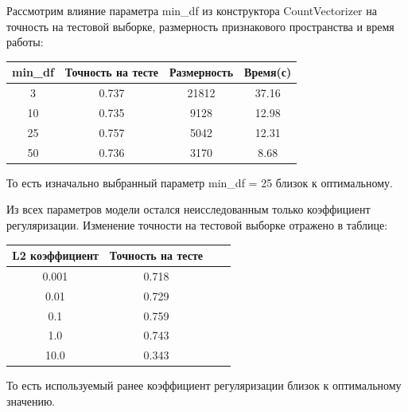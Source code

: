 \documentclass{article}
\begin{document}
                Рассмотрим влияние параметра min\_df из конструктора CountVectorizer на точность на тестовой выборке, размерность признакового пространства и время работы:
                \begin{center}
                    \begin{tabular}{| c | c | c | c |}
                        \hline
                        min\_df & Точность на тесте & Размерность & Время(с) \\
                        \hline
                        3 & 0.737 & 21812 & 37.16\\
                        \hline
                        10 & 0.735 & 9128 & 12.98 \\
                        \hline
                        25 & 0.757 & 5042 & 12.31 \\
                        \hline
                        50 & 0.736 & 3170 & 8.68 \\
                        \hline
                    \end{tabular}
                \end{center}

                То есть изначально выбранный параметр min\_df = 25 близок к оптимальному.

                Из всех параметров модели остался неисследованным только коэффициент регуляризации. Изменение точности на тестовой выборке отражено в таблице:
                \begin{center}
                    \begin{tabular}{| c | c | c | c |}
                        \hline
                        L2 коэффициент & Точность на тесте \\
                        \hline
                        0.001 & 0.718 \\
                        \hline
                        0.01 & 0.729 \\
                        \hline
                        0.1 & 0.759 \\
                        \hline
                        1.0 & 0.743 \\
                        \hline
                        10.0 & 0.343 \\
                        \hline
                    \end{tabular}
                \end{center}

                То есть используемый ранее коэффициент регуляризации близок к оптимальному значению.
\end{document}
